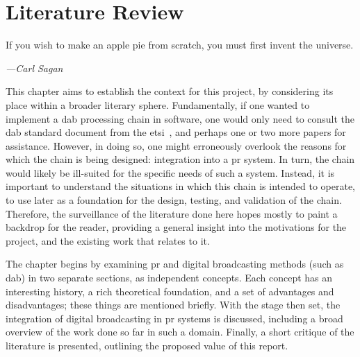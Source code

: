 \documentclass[class=report,11pt,crop=false]{standalone}
\begin{document}
\ifstandalone
\tableofcontents
\fi
\chapter{Literature Review}
\epigraph{If you wish to make an apple pie from scratch, you must first invent the universe.}%
    {\emph{---Carl Sagan}}
This chapter aims to establish the context for this project, by considering its place within a broader literary sphere. Fundamentally, if one wanted to implement a \gls{dab} processing chain in software, one would only need to consult the \gls{dab} standard document from the \gls{etsi}~\cite{dabstandard}, and perhaps one or two more papers for assistance. However, in doing so, one might erroneously overlook the reasons for which the chain is being designed: integration into a \gls{pr} system. In turn, the chain would likely be ill-suited for the specific needs of such a system. Instead, it is important to understand the situations in which this chain is intended to operate, to use later as a foundation for the design, testing, and validation of the chain. Therefore, the surveillance of the literature done here hopes mostly to paint a backdrop for the reader, providing a general insight into the motivations for the project, and the existing work that relates to it.

The chapter begins by examining \gls{pr} and digital broadcasting methods (such as \gls{dab}) in two separate sections, as independent concepts. Each concept has an interesting history, a rich theoretical foundation, and a set of advantages and disadvantages; these things are mentioned briefly. With the stage then set, the  integration of digital broadcasting in \gls{pr} systems is discussed, including a broad overview of the work done so far in such a domain. Finally, a short critique of the literature is presented, outlining the proposed value of this report.

\end{document}
